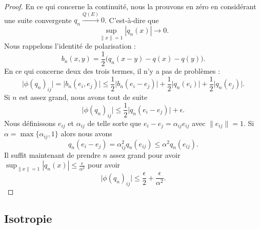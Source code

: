 \begin{proof}
    En ce qui concerne la continuité, nous la prouvons en zéro en considérant une suite convergente \( q_n\stackrel{Q(E)}{\longrightarrow}0\). C'est-à-dire que
    \begin{equation}
        \sup_{\| x \|=1}| q_n(x) |\to 0.
    \end{equation}
    Nous rappelons l'identité de polarisation :
    \begin{equation}
        b_n(x,y)=\frac{ 1 }{2}\big( q_n(x-y)-q(x)-q(y) \big).
    \end{equation}
    En ce qui concerne deux des trois termes, il n'y a pas de problèmes :
    \begin{equation}
        \big| \phi(q_n)_{ij} \big|=\big| b_n(e_i,e_j) \big|\leq\frac{ 1 }{2}\big| b_n(e_i-e_j) \big|+\frac{ 1 }{2}\big| q_n(e_i) \big|+\frac{ 1 }{2}\big| q_n(e_j) \big|.
    \end{equation}
    Si \( n\) est assez grand, nous avons tout de suite
    \begin{equation}
        \big| \phi(q_n)_{ij} \big|\leq \frac{ 1 }{2}\big| q_n(e_i-e_j) \big|+\epsilon.
    \end{equation}
    Nous définissons \( e_{ij}\) et \( \alpha_{ij}\) de telle sorte que \( e_i-e_j=\alpha_{ij}e_{ij}\) avec \( \| e_{ij} \|=1\). Si \( \alpha=\max\{ \alpha_{ij},1 \}\) alors nous avons
    \begin{equation}
        q_n(e_i-e_j)=\alpha_{ij}^2q_n(e_{ij})\leq \alpha^2q_n(e_{ij}).
    \end{equation}
    Il suffit maintenant de prendre \( n\) assez grand pour avoir \( \sup_{\| x \|=1}| q_n(x) |\leq \frac{ \epsilon }{ \alpha^2 }\) pour avoir
    \begin{equation}
        \big| \phi(q_n)_{ij} \big|\leq \frac{ \epsilon }{2}+\frac{ \epsilon }{ \alpha^2 }.
    \end{equation}
\end{proof}


\subsection{Isotropie}

